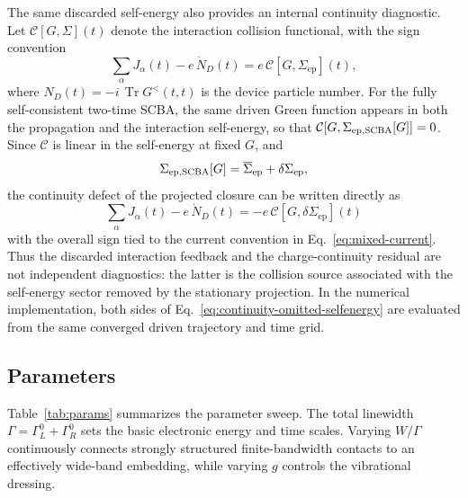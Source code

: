 \documentclass[
 reprint,
 superscriptaddress,
 amsmath,amssymb,
 aps,prb,
 longbibliography,
 floatfix
]{revtex4-2}
\newcommand{\Tr}{\operatorname{Tr}}
\newcommand{\ep}{\mathrm{ep}}
\newcommand{\barSigma}{\overline{\Sigma}}
\begin{document}
The same discarded self-energy also provides an internal continuity diagnostic. Let
\(\mathcal C[G,\Sigma](t)\) denote the interaction collision functional, with the sign convention
\begin{equation}
\sum_\alpha J_\alpha(t)-e\,\dot N_D(t)
=
e\,\mathcal C[G,\Sigma_{\ep}](t),
\label{eq:collision-continuity-convention}
\end{equation}
where \(N_D(t)=-i\,\Tr G^<(t,t)\) is the device particle number. For the fully self-consistent two-time SCBA, the same driven Green function appears in both the propagation and the interaction self-energy, so that
\(\mathcal C[G,\Sigma_{\ep,\rm SCBA}[G]]=0\). Since \(\mathcal C\) is linear in the self-energy at fixed \(G\), and
\begin{equation*}
\Sigma_{\ep,\rm SCBA}[G]
=
\barSigma_{\ep}
+
\delta\Sigma_{\ep},
\end{equation*}
the continuity defect of the projected closure can be written directly as
\begin{equation}
\boxed{
\sum_\alpha J_\alpha(t)-e\,\dot N_D(t)
=
-e\,\mathcal C[G,\delta\Sigma_{\ep}](t)
}
\label{eq:continuity-omitted-selfenergy}
\end{equation}
with the overall sign tied to the current convention in Eq.~\eqref{eq:mixed-current}. Thus the discarded interaction feedback and the charge-continuity residual are not independent diagnostics: the latter is the collision source associated with the self-energy sector removed by the stationary projection. In the numerical implementation, both sides of Eq.~\eqref{eq:continuity-omitted-selfenergy} are evaluated from the same converged driven trajectory and time grid.

\subsection{Parameters}
\label{sec:dot-parameters}

Table~\ref{tab:params} summarizes the parameter sweep. The total linewidth $\Gamma=\Gamma_L^0+\Gamma_R^0$ sets the basic electronic energy and time scales. Varying $W/\Gamma$ continuously connects strongly structured finite-bandwidth contacts to an effectively wide-band embedding, while varying $g$ controls the vibrational dressing.
\end{document}
